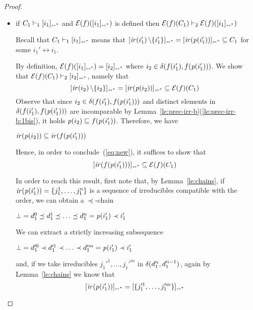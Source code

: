 \begin{proof}
\begin{itemize}
   
   \item if $C_1 \vdash_1 [{i_1}]_{\scriptscriptstyle {\leftrightarrow^*}}$ and
     $\mathcal{E}({f})([{i_1}]_{\scriptscriptstyle {\leftrightarrow^*}})$ is defined then
     $\mathcal{E}({f})(C_1) \vdash_2 \mathcal{E}({f})([{i_1}]_{\scriptscriptstyle {\leftrightarrow^*}})$

     Recall that $C_1 \vdash_1 [{i_1}]_{\scriptscriptstyle {\leftrightarrow^*}}$ means that 
     $[{\mathop{\mathit{ir}({i_1'})} \setminus \{ i_1'\}}]_{\scriptscriptstyle {\leftrightarrow^*}} =
     [{\mathop{\mathit{ir}({\mathit{p}({i_1'})})}}]_{\scriptscriptstyle {\leftrightarrow^*}} \subseteq C_1$ for some
     $i_1' \leftrightarrow i_1$.

     By definition, $\mathcal{E}({f})([{i_1}]_{\scriptscriptstyle {\leftrightarrow^*}}) = [{i_2}]_{\scriptscriptstyle {\leftrightarrow^*}}$ where
     $i_2 \in \delta({f(i_1')},{f(\mathit{p}({i_1'}))})$. We show that
     $\mathcal{E}({f})(C_1) \vdash_2 [{i_2}]_{\scriptscriptstyle {\leftrightarrow^*}}$, namely that
     \begin{equation}
       \label{eq:new}
       [{\mathop{\mathit{ir}({i_2})}\setminus \{ i_2\} }]_{\scriptscriptstyle {\leftrightarrow^*}} =
       [{\mathop{\mathit{ir}({\mathit{p}({i_2})})}}]_{\scriptscriptstyle {\leftrightarrow^*}} \subseteq \mathcal{E}({f})(C_1)
     \end{equation}
     Observe that since $i_2 \in \delta({f(i_1')},{f(\mathit{p}({i_1'}))}) $ and
     distinct elements in $\delta({f(i_1')},{f(\mathit{p}({i_1'}))})$ are
       incomparable by
       Lemma~\ref{le:prec-irr-b}(\ref{le:prec-irr-b:1bis}), it holds
       $\mathit{p}({i_2}) \sqsubseteq f(\mathit{p}({i_1'}))$. Therefore, we have
     \begin{center}
       $\mathop{\mathit{ir}({\mathit{p}({i_2})})} \subseteq \mathop{\mathit{ir}({f(\mathit{p}({i_1'}))})}$
     \end{center}
     Hence, in order to conclude~(\ref{eq:new}), it suffices to show that
     \begin{equation}
       \label{eq:obj}
       [{\mathop{\mathit{ir}({f(\mathit{p}({i_1'}))})}}]_{\scriptscriptstyle {\leftrightarrow^*}} \subseteq \mathcal{E}({f})(C_1)
     \end{equation}
   
     In order to reach this result, first note that, by
     Lemma~\ref{le:chains}, if
     $\mathop{\mathit{ir}({\mathit{p}({i_1'})})} = \{ j_1^1, \ldots, j_1^n \}$ is a sequence of
     irreducibles compatible with the order, we can obtain a
     $\preceq$-chain
     \begin{center}
       $\bot = d_1^0 \preceq d_1^1 \preceq \ldots \preceq d_1^n =
       \mathit{p}({i_1'}) \prec i_1'$
     \end{center}
     We can extract a strictly increasing subsequence
     \begin{center}
       $\bot = d_1'^0 \prec d_1'^1 \prec \ldots \prec d_1'^m =
       \mathit{p}({i_1'}) \prec i_1'$
     \end{center}
     and, if we take irreducibles $j_1'^1, \ldots, j_1'^m$ in
     $\delta({d_1'^{i}},{d_1'^{i-1}})$, again by Lemma~\ref{le:chains} we
     know that
     \begin{equation}
       \label{eq:chain}
       [{\mathop{\mathit{ir}({\mathit{p}({i_1'})})}}]_{\scriptscriptstyle {\leftrightarrow^*}} = [{\{j_1'^1, \ldots,
         j_1'^m\}}]_{\scriptscriptstyle {\leftrightarrow^*}}
     \end{equation}
   

\end{itemize}
\end{proof}
